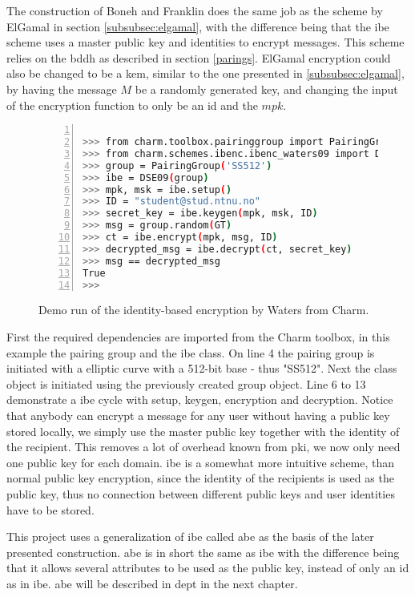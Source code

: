 \par The construction of Boneh and Franklin does the same job as the scheme by ElGamal in section \ref{subsubsec:elgamal}, with the difference being that the \gls{ibe} scheme uses a master public key and identities to encrypt messages. This scheme relies on the \gls{bddh} as described in section \ref{parings}. ElGamal encryption could also be changed to be a \gls{kem}, similar to the one presented in \ref{subsubsec:elgamal}, by having the message $M$ be a randomly generated key, and changing the input of the encryption function to only be an id and the $mpk$.



\begin{figure}[H]
\begin{lstlisting}[language=bash, xleftmargin=2em, frame=single, framexleftmargin=1.5em, breaklines=true, numbers=left, numbersep=5pt, numberstyle=\tiny\color{mygray}]

>>> from charm.toolbox.pairinggroup import PairingGroup, GT
>>> from charm.schemes.ibenc.ibenc_waters09 import DSE09
>>> group = PairingGroup('SS512')
>>> ibe = DSE09(group)
>>> mpk, msk = ibe.setup()
>>> ID = "student@stud.ntnu.no"
>>> secret_key = ibe.keygen(mpk, msk, ID)
>>> msg = group.random(GT)
>>> ct = ibe.encrypt(mpk, msg, ID)
>>> decrypted_msg = ibe.decrypt(ct, secret_key)
>>> msg == decrypted_msg
True
>>> 

\end{lstlisting}
\caption{Demo run of the identity-based encryption by Waters from Charm.}
\label{fig:ibenc}
\end{figure}

First the required dependencies are imported from the Charm toolbox, in this example the pairing group and the \gls{ibe} class. On line 4 the pairing group is initiated with a elliptic curve with a 512-bit base - thus "SS512". Next the class object is initiated using the previously created group object. Line 6 to 13 demonstrate a \gls{ibe} cycle with setup, keygen, encryption and decryption.
Notice that anybody can encrypt a message for any user without having a public key stored locally, we simply use the master public key together with the identity of the recipient. This removes a lot of overhead known from \gls{pki}, we now only need one public key for each domain. \Gls{ibe} is a somewhat more intuitive scheme, than normal public key encryption, since the identity of the recipients is used as the public key, thus no connection between different public keys and user identities have to be stored.
\par This project uses a generalization of \gls{ibe} called \gls{abe} as the basis of the later presented construction. \Gls{abe} is in short the same as \gls{ibe} with the difference being that it allows several attributes to be used as the public key, instead of only an id as in \gls{ibe}. \Gls{abe} will be described in dept in the next chapter.

